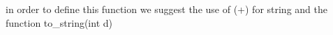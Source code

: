 
\begin{DoxyRefList}
\item[Miembro \mbox{\hyperlink{classEventSet_afc14a43734b5dc5d03289d02546c9ed9}{Event\+Set::to\+\_\+string}} () const]\label{todo__todo000001}%
%
in order to define this function we suggest the use of (+) for string and the function to\+\_\+string(int d) 
\end{DoxyRefList}